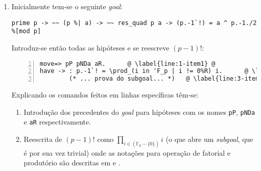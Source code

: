\begin{enumerate}[label=\textbf{\roman*.}]


        \item Inicialmente tem-se o seguinte \textit{goal}:
                \begin{lstlisting}[language=coq-error,frame=single,tabsize=1]
prime p -> ~~ (p %| a) -> ~~ res_quad p a -> (p.-1`!) = a ^ p.-1./2 %[mod p]
                \end{lstlisting}
        Introduz-se então todas as hipóteses e se reescreve $(p-1)!$:
                \begin{lstlisting}[language=coq,frame=single, numbers=left,stepnumber=1,tabsize=1,escapechar=@,name=proof]
move=> pP pNDa aR.      @ \label{line:1-item1} @
have -> : p.-1`! = \prod_(i in 'F_p | i != 0%R) i.      @ \label{line:2-item1} @
        (* ... prova do subgoal... *)   @ \label{line:3-item1} @
                \end{lstlisting}
        Explicando os comandos feitos em linhas específicas têm-se:
        \begin{enumerate}
                \item[\textbf{(\ref{line:1-item1})}] Introdução dos precedentes do \textit{goal} para hipóteses com os nomes \lstinline[language=coq]|pP|, \lstinline[language=coq]|pNDa| e \lstinline[language=coq]|aR| respectivamente.
                
                \item[\textbf{(\ref{line:2-item1})}] Reescrita de $(p-1)!$ como $\prod_{i \in (\mathbb{F}_p - \{0\})} i$ (o que abre um \textit{subgoal}, que é por sua vez trivial) onde as notações para operação de fatorial e produtório são descritas em \cite{mathcomp-ssrnat} e \cite{mathcomp-bigop}.
                
        \end{enumerate}



\end{enumerate}
